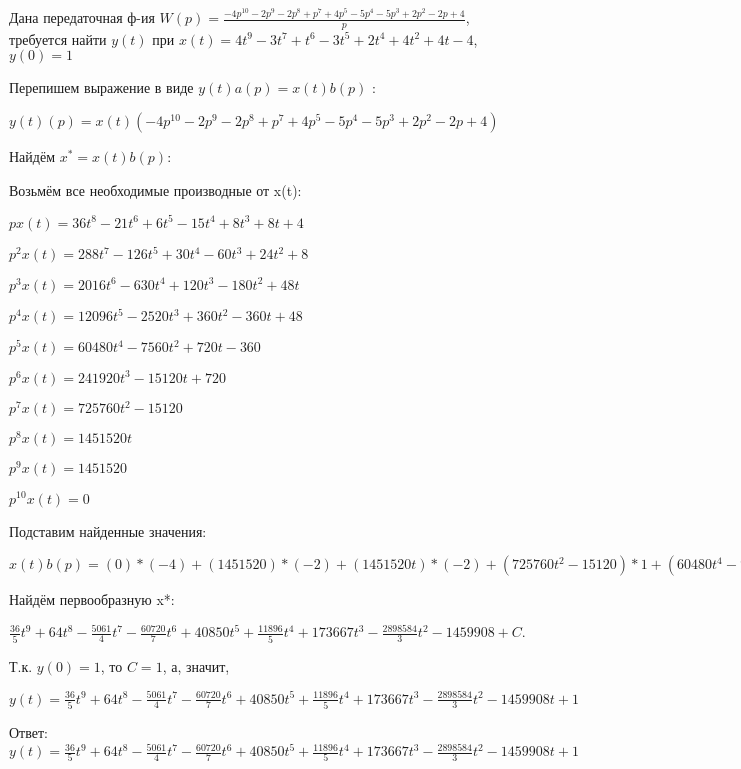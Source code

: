 \documentclass{article}
\begin{document}
{{{{{Дана передаточная ф-ия $W(p)=\frac{-4p^{10}-2p^{9}-2p^{8}+p^{7}+4p^{5}-5p^{4}-5p^{3}+2p^{2}-2p+4}{p}$, требуется найти $y(t)$ при $x(t)=4t^{9}-3t^{7}+t^{6}-3t^{5}+2t^{4}+4t^{2}+4t-4$, $y(0)=1$

Перепишем выражение в виде $y(t)a(p)=x(t)b(p)$ :

$y(t)(p)=x(t)(-4p^{10}-2p^{9}-2p^{8}+p^{7}+4p^{5}-5p^{4}-5p^{3}+2p^{2}-2p+4)$

Найдём $x^*=x(t)b(p)$:

Возьмём все необходимые производные от x(t):

$px(t)=36t^{8}-21t^{6}+6t^{5}-15t^{4}+8t^{3}+8t+4$

$p^2x(t)=288t^{7}-126t^{5}+30t^{4}-60t^{3}+24t^{2}+8$

$p^3x(t)=2016t^{6}-630t^{4}+120t^{3}-180t^{2}+48t$

$p^4x(t)=12096t^{5}-2520t^{3}+360t^{2}-360t+48$

$p^5x(t)=60480t^{4}-7560t^{2}+720t-360$

$p^6x(t)=241920t^{3}-15120t+720$

$p^7x(t)=725760t^{2}-15120$

$p^8x(t)=1451520t$

$p^9x(t)=1451520$

$p^10x(t)=0$

Подставим найденные значения:

$x(t)b(p) = (0)*(-4)+(1451520)*(-2)+(1451520t)*(-2)+(725760t^{2}-15120)*1+(60480t^{4}-7560t^{2}+720t-360)*4+(12096t^{5}-2520t^{3}+360t^{2}-360t+48)*(-5)+(2016t^{6}-630t^{4}+120t^{3}-180t^{2}+48t)*(-5)+(288t^{7}-126t^{5}+30t^{4}-60t^{3}+24t^{2}+8)*2+(36t^{8}-21t^{6}+6t^{5}-15t^{4}+8t^{3}+8t+4)*(-2)+(36t^{8}-21t^{6}+6t^{5}-15t^{4}+8t^{3}+8t+4)*4=72t^{8}+576t^{7}-10122t^{6}-60720t^{5}+245100t^{4}+11896t^{3}+694668t^{2}-2898584t$





Найдём первообразную x*:

$\frac{36}{5}t^{9}+64t^{8}-\frac{5061}{4}t^{7}-\frac{60720}{7}t^{6}+40850t^{5}+\frac{11896}{5}t^{4}+173667t^{3}-\frac{2898584}{3}t^{2}-1459908+C.$

Т.к. $y(0)=1$, то $C=1$, а, значит, 

$y(t)=\frac{36}{5}t^{9}+64t^{8}-\frac{5061}{4}t^{7}-\frac{60720}{7}t^{6}+40850t^{5}+\frac{11896}{5}t^{4}+173667t^{3}-\frac{2898584}{3}t^{2}-1459908t+1$

Ответ: $y(t) = \frac{36}{5}t^{9}+64t^{8}-\frac{5061}{4}t^{7}-\frac{60720}{7}t^{6}+40850t^{5}+\frac{11896}{5}t^{4}+173667t^{3}-\frac{2898584}{3}t^{2}-1459908t+1$

}}}}}
\end{document}

